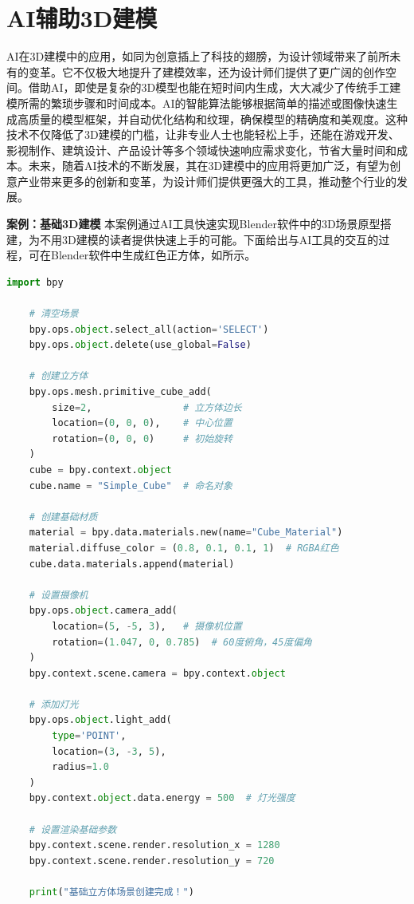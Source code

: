 \section{AI辅助3D建模}


AI在3D建模中的应用，如同为创意插上了科技的翅膀，为设计领域带来了前所未有的变革。它不仅极大地提升了建模效率，还为设计师们提供了更广阔的创作空间。借助AI，即使是复杂的3D模型也能在短时间内生成，大大减少了传统手工建模所需的繁琐步骤和时间成本。AI的智能算法能够根据简单的描述或图像快速生成高质量的模型框架，并自动优化结构和纹理，确保模型的精确度和美观度。这种技术不仅降低了3D建模的门槛，让非专业人士也能轻松上手，还能在游戏开发、影视制作、建筑设计、产品设计等多个领域快速响应需求变化，节省大量时间和成本。未来，随着AI技术的不断发展，其在3D建模中的应用将更加广泛，有望为创意产业带来更多的创新和变革，为设计师们提供更强大的工具，推动整个行业的发展。


\textbf{案例：基础3D建模}
本案例通过AI工具快速实现Blender软件中的3D场景原型搭建，为不用3D建模的读者提供快速上手的可能。下面给出与AI工具的交互的过程，可在Blender软件中生成红色正方体，如所示。



\begin{gptbox}
\small{ 
\begin{lstlisting}[language=Python] 
    import bpy
    
    # 清空场景
    bpy.ops.object.select_all(action='SELECT')
    bpy.ops.object.delete(use_global=False)
    
    # 创建立方体
    bpy.ops.mesh.primitive_cube_add(
        size=2,                # 立方体边长
        location=(0, 0, 0),    # 中心位置
        rotation=(0, 0, 0)     # 初始旋转
    )
    cube = bpy.context.object
    cube.name = "Simple_Cube"  # 命名对象
    
    # 创建基础材质
    material = bpy.data.materials.new(name="Cube_Material")
    material.diffuse_color = (0.8, 0.1, 0.1, 1)  # RGBA红色
    cube.data.materials.append(material)
    
    # 设置摄像机
    bpy.ops.object.camera_add(
        location=(5, -5, 3),   # 摄像机位置
        rotation=(1.047, 0, 0.785)  # 60度俯角，45度偏角
    )
    bpy.context.scene.camera = bpy.context.object
    
    # 添加灯光
    bpy.ops.object.light_add(
        type='POINT',
        location=(3, -3, 5),
        radius=1.0
    )
    bpy.context.object.data.energy = 500  # 灯光强度
    
    # 设置渲染基础参数
    bpy.context.scene.render.resolution_x = 1280
    bpy.context.scene.render.resolution_y = 720
    
    print("基础立方体场景创建完成！")

\end{lstlisting}
} 
\end{gptbox}


